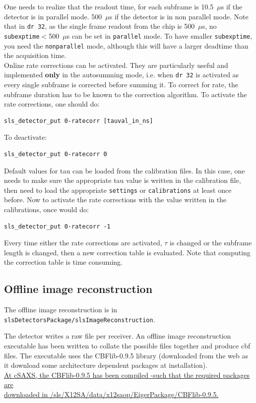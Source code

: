 \documentclass{article}
\begin{document}
One needs to realize that the readout time, for each subframe is 10.5~$\mu$s if the detector is in parallel mode. 500~$\mu$s if the detector is in non parallel mode. Note that in {\tt{dr 32}}, as the single frame readout from the chip is 500~$\mu$s, no {\tt{subexptime}}$<$500~$\mu$s can be set in {\tt{parallel}} mode. To have smaller {\tt{subexptime}}, you need the {\tt{nonparallel}} mode, although this will have a larger deadtime than the acquisition time.\\

Online rate corrections can be activated. They are particularly useful and implemented \textbf{only} in the autosumming mode, i.e. when {\tt{dr 32}} is activated as  every single subframe is corrected before summing it. To correct for rate, the subframe duration has to be known to the correction algorithm.    
To activate the rate corrections, one should do:\\
\begin{verbatim}
sls_detector_put 0-ratecorr [tauval_in_ns]
\end{verbatim}
To deactivate:
\begin{verbatim}
sls_detector_put 0-ratecorr 0
\end{verbatim}
Default values for tau can be loaded from the calibration files. In this case, one needs to make sure the appropriate tau value is written in the calibration file, then need to load the appropriate {\tt{settings}} or {\tt{calibrations}} at least once before. Now to activate the rate corrections with the value written in the calibrations, once would do: 
\begin{verbatim}
sls_detector_put 0-ratecorr -1
\end{verbatim}

Every time either the rate corrections are activated, $\tau$ is changed or the subframe length is changed, then a new correction table is evaluated. Note that computing the correction table is time consuming. 

\subsection{Offline image reconstruction}
The offline image reconstruction is in {\tt{slsDetectorsPackage/slsImageReconstruction}}.

The detector writes a raw file per receiver. An offline image reconstruction executable has been written to collate the possible files together and produce cbf files. The executable uses the CBFlib-0.9.5 library (downloaded from the web as it download some architecture dependent packages at installation).\\
\underline{At cSAXS, the CBFlib-0.9.5 has been compiled -such that the required packages are}\\\underline{ downloaded in /sls/X12SA/data/x12saop/EigerPackage/CBFlib-0.9.5.}\\ 
\end{document}

